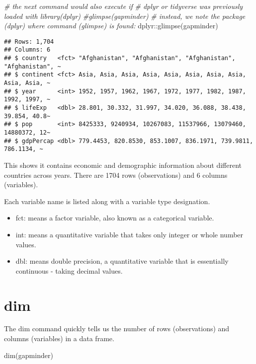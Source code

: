\documentclass[
]{book}
\newenvironment{Shaded}{\begin{snugshade}}{\end{snugshade}}
\newcommand{\CommentTok}[1]{\textcolor[rgb]{0.56,0.35,0.01}{\textit{#1}}}
\newcommand{\FunctionTok}[1]{\textcolor[rgb]{0.00,0.00,0.00}{#1}}
\newcommand{\NormalTok}[1]{#1}
\newcommand{\SpecialCharTok}[1]{\textcolor[rgb]{0.00,0.00,0.00}{#1}}
\providecommand{\tightlist}{%
  \setlength{\itemsep}{0pt}\setlength{\parskip}{0pt}}
\begin{document}
\begin{Shaded}
\begin{Highlighting}[]
\CommentTok{\# the next command would also execute if}
\CommentTok{\# dplyr or tidyverse was previously loaded with library(dplyr)}
\CommentTok{\#glimpse(gapminder)}
\CommentTok{\# instead, we note the package (dplyr) where command (glimpse) is found:}
\NormalTok{dplyr}\SpecialCharTok{::}\FunctionTok{glimpse}\NormalTok{(gapminder)}
\end{Highlighting}
\end{Shaded}

\begin{verbatim}
## Rows: 1,704
## Columns: 6
## $ country   <fct> "Afghanistan", "Afghanistan", "Afghanistan", "Afghanistan", ~
## $ continent <fct> Asia, Asia, Asia, Asia, Asia, Asia, Asia, Asia, Asia, Asia, ~
## $ year      <int> 1952, 1957, 1962, 1967, 1972, 1977, 1982, 1987, 1992, 1997, ~
## $ lifeExp   <dbl> 28.801, 30.332, 31.997, 34.020, 36.088, 38.438, 39.854, 40.8~
## $ pop       <int> 8425333, 9240934, 10267083, 11537966, 13079460, 14880372, 12~
## $ gdpPercap <dbl> 779.4453, 820.8530, 853.1007, 836.1971, 739.9811, 786.1134, ~
\end{verbatim}

This shows it contains economic and demographic information about different countries across years. There are 1704 rows (observations) and 6 columns (variables).

Each variable name is listed along with a variable type designation.

\begin{itemize}
\tightlist
\item
  fct: means a factor variable, also known as a categorical variable.
\item
  int: means a quantitative variable that takes only integer or whole number values.
\item
  dbl: means double precision, a quantitative variable that is essentially continuous - taking decimal values.
\end{itemize}

\hypertarget{dim}{%
\section{dim}\label{dim}}

The dim command quickly tells us the number of rows (observations) and columns (variables) in a data frame.

\begin{Shaded}
\begin{Highlighting}[]
\FunctionTok{dim}\NormalTok{(gapminder)}
\end{Highlighting}
\end{Shaded}
\end{document}
